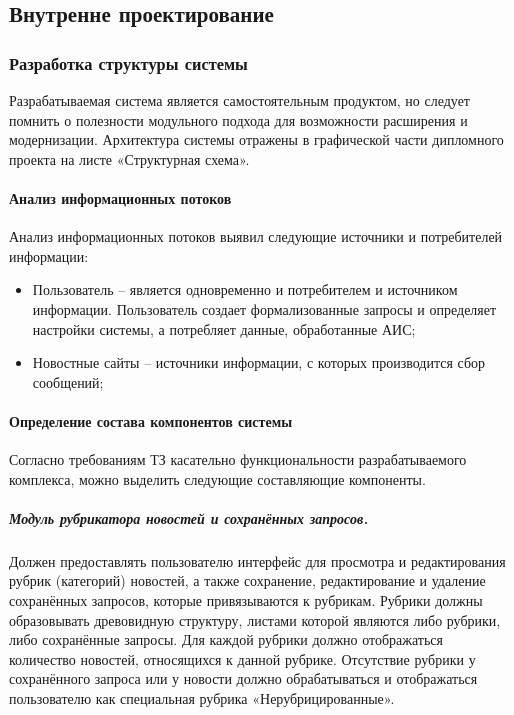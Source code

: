 \subsection{Внутренне проектирование}
\subsubsection{Разработка структуры системы}

Разрабатываемая система является самостоятельным продуктом, но следует помнить о полезности модульного подхода для возможности расширения и модернизации. Архитектура системы отражены в графической части дипломного проекта на листе «Структурная схема».

\paragraph{Анализ информационных потоков} \hfill

Анализ информационных потоков выявил следующие источники и потребителей информации:
\begin{itemize}
\item Пользователь -- является одновременно и потребителем и источником информации. Пользователь создает формализованные запросы и определяет настройки системы, а потребляет данные, обработанные АИС;
\item Новостные сайты -- источники информации, с которых производится сбор сообщений;
\end{itemize}

\paragraph{Определение состава компонентов системы} \hfill

Согласно требованиям ТЗ касательно функциональности разрабатываемого комплекса, можно выделить следующие составляющие компоненты.

\subparagraph{Модуль рубрикатора новостей и сохранённых запросов.} \hfill

Должен предоставлять пользователю интерфейс для просмотра и редактирования рубрик (категорий) новостей, а также сохранение, редактирование и удаление сохранённых запросов, которые привязываются к рубрикам. Рубрики должны образовывать древовидную структуру, листами которой являются либо рубрики, либо сохранённые запросы. Для каждой рубрики должно отображаться количество новостей, относящихся к данной рубрике. Отсутствие рубрики у сохранённого запроса или у новости должно обрабатываться и отображаться пользователю как специальная рубрика «Нерубрицированные».


